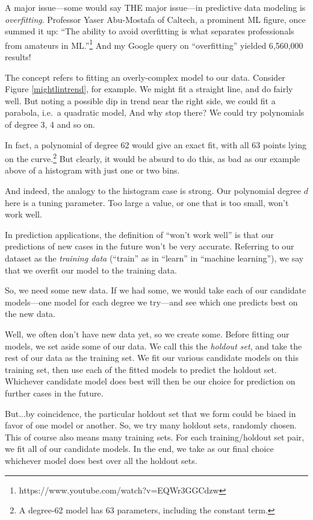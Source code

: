 A major issue---some would say THE major issue---in predictive
data modeling is \textit{overfitting}.  Professor Yaser
Abu-Mostafa of Caltech, a prominent ML figure, once summed it up: ``The
ability to avoid overfitting is what separates professionals from
amateurs in ML.''\footnote{https://www.youtube.com/watch?v=EQWr3GGCdzw}
And my Google query on ``overfitting'' yielded 6,560,000 results!

The concept refers to fitting an overly-complex model to our data.
Consider Figure \ref{mightlintrend}, for example.  We might fit a
straight line, and do fairly well.  But noting a possible dip in trend
near the right side, we could fit a parabola, i.e.\  a quadratic model,
And why stop there?  We could try polynomials of degree 3, 4 and so on.

In fact, a polynomial of degree 62 would give an exact fit, with all 63
points lying on the curve.\footnote{A degree-62 model has 63 parameters,
including the constant term.} But clearly, it would be absurd to do
this, as bad as our example above of a histogram with just one or two
bins.

And indeed, the analogy to the histogram case is strong.  Our polynomial
degree $d$ here is a tuning parameter.  Too large a value, or one that
is too small, won't work well.

In prediction applications, the definition of ``won't work well'' is
that our predictions of new cases in the future won't be very accurate.
Referring to our dataset as the \textit{training data} (``train'' as in
``learn'' in ``machine learning''), we say that we overfit our model to
the training data.  

So, we need some new data.  If we had some, we would take each of our
candidate models---one model for each degree we try---and see which
one predicts best on the new data.

Well, we often don't have new data yet, so we create some.  Before
fitting our models, we set aside some of our data.  We call this the
\textit{holdout set}, and take the rest of our data as the training set.
We fit our various candidate models on this training set, then use each
of the fitted models to predict the holdout set.  Whichever candidate
model does best will then be our choice for prediction on further cases
in the future.

But...by coincidence, the particular holdout set that we form could be
biaed in favor of one model or another.  So, we try many holdout sets,
randomly chosen.  This of course also means many training sets.  For
each training/holdout set pair, we fit all of our candidate models.  In
the end, we take as our final choice whichever model does best over all
the holdout sets.
